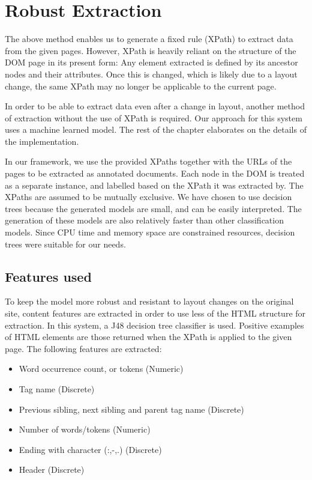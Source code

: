 \section{Robust Extraction}
\label{section:extraction}
The above method enables us to generate a fixed rule (XPath) to extract data from the given pages. However, XPath is heavily reliant on the structure of the DOM page in its present form: Any element extracted is defined by its ancestor nodes and their attributes. Once this is changed, which is likely due to a layout change, the same XPath may no longer be applicable to the current page. 

In order to be able to extract data even after a change in layout, another method of extraction without the use of XPath is required. Our approach for this system uses a machine learned model. The rest of the chapter elaborates on the details of the implementation.

In our framework, we use the provided XPaths together with the URLs of the pages to be extracted as annotated documents. Each node in the DOM is treated as a separate instance, and labelled based on the XPath it was extracted by. The XPaths are assumed to be mutually exclusive. We have chosen to use decision trees because the generated models are small, and can be easily interpreted. The generation of these models are also relatively faster than other classification models. Since CPU time and memory space are constrained resources, decision trees were suitable for our needs.

\subsection{Features used}
To keep the model more robust and resistant to layout changes on the original site, content features are extracted in order to use less of the HTML structure for extraction. In this system, a J48 decision tree classifier is used. Positive examples of HTML elements are those returned when the XPath is applied to the given page. The following features are extracted:

	\begin{itemize}
		\item Word occurrence count, or tokens (Numeric)
		\item Tag name (Discrete)
		\item Previous sibling, next sibling and parent tag name (Discrete)
		\item Number of words/tokens (Numeric)
		\item Ending with character (:,-,.) (Discrete)
		\item Header (Discrete)
	\end{itemize}
	

